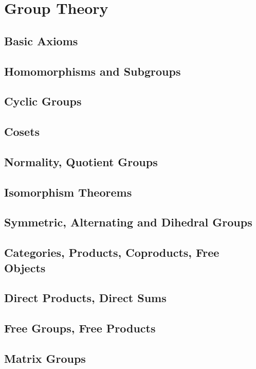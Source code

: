 \documentclass[a4paper,sfsidenotes,openany]{tufte-book}
\theoremstyle{theorem}
\begin{document}
\chapter{Group Theory}
\begin{fullwidth}
\section{Basic Axioms}

\section{Homomorphisms and Subgroups}

\section{Cyclic Groups}

\section{Cosets}

\section{Normality, Quotient Groups}

\section{Isomorphism Theorems}

\section{Symmetric, Alternating and Dihedral Groups}

\section{Categories, Products, Coproducts, Free Objects}

\section{Direct Products, Direct Sums}

\section{Free Groups, Free Products}

\section{Matrix Groups}
	
\end{fullwidth}
\end{document}
